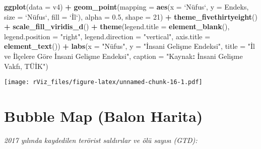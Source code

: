 \documentclass[
]{book}
\newenvironment{Shaded}{\begin{snugshade}}{\end{snugshade}}
\newcommand{\DataTypeTok}[1]{\textcolor[rgb]{0.13,0.29,0.53}{#1}}
\newcommand{\DecValTok}[1]{\textcolor[rgb]{0.00,0.00,0.81}{#1}}
\newcommand{\FloatTok}[1]{\textcolor[rgb]{0.00,0.00,0.81}{#1}}
\newcommand{\KeywordTok}[1]{\textcolor[rgb]{0.13,0.29,0.53}{\textbf{#1}}}
\newcommand{\NormalTok}[1]{#1}
\newcommand{\OperatorTok}[1]{\textcolor[rgb]{0.81,0.36,0.00}{\textbf{#1}}}
\newcommand{\StringTok}[1]{\textcolor[rgb]{0.31,0.60,0.02}{#1}}
\begin{document}
\begin{Shaded}
\begin{Highlighting}[]
\KeywordTok{ggplot}\NormalTok{(}\DataTypeTok{data =}\NormalTok{ v4) }\OperatorTok{+}
\StringTok{  }\KeywordTok{geom_point}\NormalTok{(}\DataTypeTok{mapping =} \KeywordTok{aes}\NormalTok{(}\DataTypeTok{x =} \StringTok{`}\DataTypeTok{Nüfus`, y = Endeks, size = }\StringTok{`}\NormalTok{Nüfus`, }\DataTypeTok{fill =} \StringTok{`}\DataTypeTok{İl}\StringTok{`}\NormalTok{), }\DataTypeTok{alpha =} \FloatTok{0.5}\NormalTok{, }\DataTypeTok{shape =} \DecValTok{21}\NormalTok{) }\OperatorTok{+}
\StringTok{  }\KeywordTok{theme_fivethirtyeight}\NormalTok{() }\OperatorTok{+}
\StringTok{  }\KeywordTok{scale_fill_viridis_d}\NormalTok{() }\OperatorTok{+}
\StringTok{  }\KeywordTok{theme}\NormalTok{(}\DataTypeTok{legend.title =} \KeywordTok{element_blank}\NormalTok{(),}
        \DataTypeTok{legend.position =} \StringTok{"right"}\NormalTok{,}
        \DataTypeTok{legend.direction =} \StringTok{"vertical"}\NormalTok{,}
        \DataTypeTok{axis.title =} \KeywordTok{element_text}\NormalTok{()) }\OperatorTok{+}
\StringTok{  }\KeywordTok{labs}\NormalTok{(}\DataTypeTok{x =} \StringTok{"Nüfus",}
\StringTok{       y = "}\NormalTok{İnsani Gelişme Endeksi}\StringTok{",}
\StringTok{       title = "}\NormalTok{İl ve İlçelere Göre İnsani Gelişme Endeksi}\StringTok{",}
\StringTok{       caption = "}\NormalTok{Kaynak}\OperatorTok{:}\StringTok{ }\NormalTok{İnsani Gelişme Vakfı, TÜİK}\StringTok{")}
\end{Highlighting}
\end{Shaded}

\texttt{[image: rViz\_files/figure-latex/unnamed-chunk-16-1.pdf]}

\hypertarget{bubble-map-balon-harita}{%
\section{Bubble Map (Balon Harita)}\label{bubble-map-balon-harita}}

\emph{2017 yılında kaydedilen terörist saldırılar ve ölü sayısı (GTD):}
\end{document}
